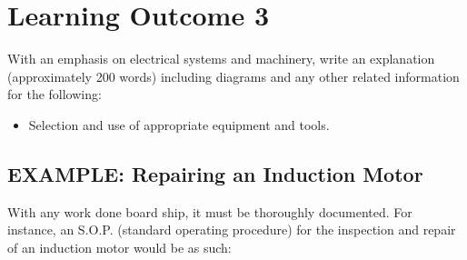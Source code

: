 \documentclass[11pt,a4paper]{article}
\begin{document}
\section{Learning Outcome 3}
\begin{tcolorbox}[colback=red!5!white,colframe=red!75!black,title=\textbf{Demonstrate basic understanding of executing routine maintenance and repair procedures}]
With an emphasis on electrical systems and machinery, write an explanation (approximately 200 words) including diagrams and any other related information for the following:
\begin{itemize}
\item Selection and use of appropriate equipment and tools.
\end{itemize}
\end{tcolorbox}
\subsection{EXAMPLE: Repairing an Induction Motor}
With any work done board ship, it must be thoroughly documented. For instance, an S.O.P. (standard operating procedure) for the inspection and repair of an induction motor would be as such:
\end{document}
